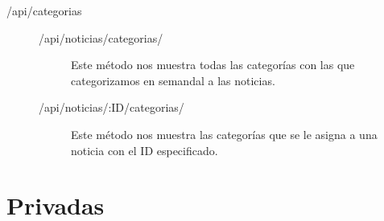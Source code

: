 \begin{description}
\begin{description}
\end{description}

\item[/api/categorias]
\begin{description}
\item[/api/noticias/categorias/]
Este método nos muestra todas las categorías con las que categorizamos en semandal a las noticias.


\item[/api/noticias/:ID/categorias/]
Este método nos muestra las categorías que se le asigna a una noticia con el ID especificado.


\end{description}

\end{description}

\section{Privadas}
